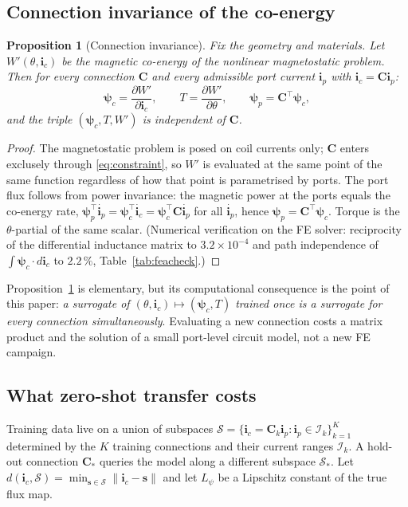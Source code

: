 \documentclass[review]{elsarticle}
\newtheorem{proposition}{Proposition}
\newcommand{\ic}{\boldsymbol{i}_c}
\newcommand{\ip}{\boldsymbol{i}_p}
\newcommand{\psic}{\boldsymbol{\psi}_c}
\newcommand{\psip}{\boldsymbol{\psi}_p}
\newcommand{\Cmat}{\boldsymbol{C}}
\begin{document}
\subsection{Connection invariance of the co-energy}

\begin{proposition}[Connection invariance]
\label{prop:invariance}
Fix the geometry and materials. Let $W'(\theta,\ic)$ be the magnetic
co-energy of the nonlinear magnetostatic problem. Then for every connection
$\Cmat$ and every admissible port current $\ip$ with $\ic=\Cmat\ip$:
\begin{equation}
\psic=\frac{\partial W'}{\partial \ic},\qquad
T=\frac{\partial W'}{\partial\theta},\qquad
\psip=\Cmat^{\!\top}\psic ,
\label{eq:ports}
\end{equation}
and the triple $(\psic,T,W')$ is independent of $\Cmat$.
\end{proposition}

\begin{proof}
The magnetostatic problem is posed on coil currents only; $\Cmat$ enters
exclusely through \eqref{eq:constraint}, so $W'$ is evaluated at the same
point of the same function regardless of how that point is parametrised by
ports. The port flux follows from power invariance: the magnetic power at the
ports equals the co-energy rate,
$\psip^{\!\top}\dot{\ip} = \psic^{\!\top}\dot{\ic}
= \psic^{\!\top}\Cmat\dot{\ip}$ for all $\dot{\ip}$, hence
$\psip=\Cmat^{\!\top}\psic$. Torque is the $\theta$-partial of the same
scalar. (Numerical verification on the FE solver: reciprocity of the
differential inductance matrix to $3.2\times10^{-4}$ and path independence of
$\int\psic\cdot d\ic$ to $2.2\,\%$, Table~\ref{tab:feacheck}.)
\end{proof}

Proposition~\ref{prop:invariance} is elementary, but its computational
consequence is the point of this paper: \emph{a surrogate of
$(\theta,\ic)\mapsto(\psic,T)$ trained once is a surrogate for every
connection simultaneously}. Evaluating a new connection costs a matrix
product and the solution of a small port-level circuit model, not a new FE
campaign.

\subsection{What zero-shot transfer costs}

Training data live on a union of subspaces
$\mathcal{S}=\{\ic=\Cmat_k\ip:\ip\in\mathcal{I}_k\}_{k=1}^{K}$ determined by
the $K$ training connections and their current ranges $\mathcal{I}_k$. A
hold-out connection $\Cmat_\ast$ queries the model along a different
subspace $\mathcal{S}_\ast$. Let
$d(\ic,\mathcal{S})=\min_{\boldsymbol{s}\in\mathcal{S}}\|\ic-\boldsymbol{s}\|$
and let $L_{\psi}$ be a Lipschitz constant of the true flux map.
\end{document}
